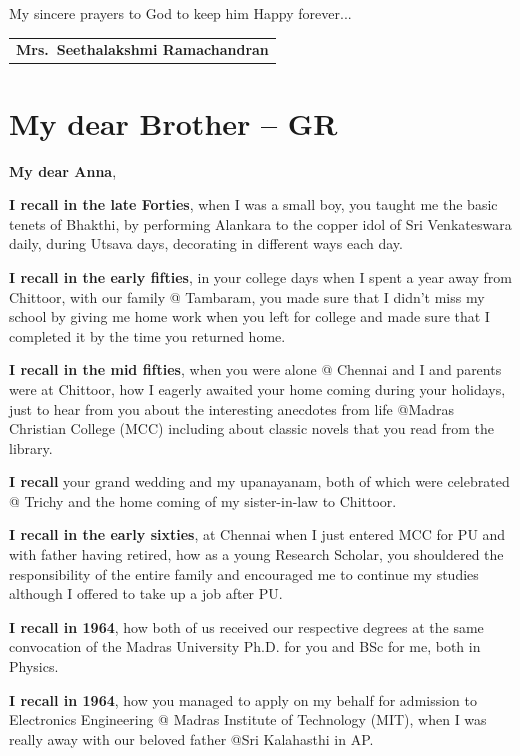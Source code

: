 My sincere prayers to God to keep him Happy forever...
\bigskip

\begin{flushright}
\begin{tabular}{c}
\textbf{Mrs.\ Seethalakshmi Ramachandran}
\end{tabular}
\end{flushright}
\bigskip

\section*{My dear Brother – GR}

\noindent 
\textbf{My dear Anna},

\textbf{I recall in the late Forties}, when I was a small boy, you taught me the basic tenets of Bhakthi, by performing Alankara to the copper idol of Sri Venkateswara daily, during Utsava days, decorating in different ways each day.

\textbf{I recall in the early fifties}, in your college days when I spent a year away from Chittoor, with our family @ Tambaram, you made sure that I didn’t miss my school by giving me home work when you left for college and made sure that I completed it by the time you returned home.

\textbf{I recall in the mid fifties}, when you were alone @ Chennai and I and parents were at Chittoor, how I eagerly awaited your home coming during your holidays, just to hear from you about the interesting anecdotes from life @Madras Christian  College (MCC) including about classic novels that you read from the library.

\textbf{I recall} your grand wedding and my upanayanam, both of which were celebrated @ Trichy and the home coming of my sister-in-law to Chittoor.

\textbf{I recall in the early sixties}, at Chennai when I just entered MCC for PU and with father having retired, how as a young Research Scholar, you shouldered the responsibility of the entire family and encouraged me to continue my studies although I offered to take up a job after PU.

\textbf{I recall in 1964}, how both of us received our respective degrees at the same convocation of the Madras University Ph.D. for you and BSc for me, both in Physics.

\textbf{I recall in 1964}, how you managed to apply on my behalf for admission to Electronics Engineering @ Madras Institute of Technology (MIT), when I was really away with our beloved father @Sri Kalahasthi in AP.

